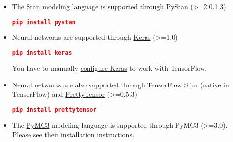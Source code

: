 \begin{itemize}
  \item The \href{http://mc-stan.org}{Stan} modeling language is supported
  through PyStan (>=2.0.1.3)
\begin{lstlisting}[language=JSON]
pip install pystan
\end{lstlisting}
  \item Neural networks are supported through
  \href{http://keras.io}{Keras} (>=1.0)
\begin{lstlisting}[language=JSON]
pip install keras
\end{lstlisting}
You have to manually \href{http://keras.io/#switching-from-theano-to-tensorflow}
{configure Keras} to work with TensorFlow.
\item Neural networks are also supported through
\href{https://github.com/tensorflow/tensorflow/tree/master/tensorflow/contrib/slim}{TensorFlow
Slim} (native in TensorFlow) and
\href{https://github.com/google/prettytensor}{PrettyTensor} (>=0.5.3)
\begin{lstlisting}[language=JSON]
pip install prettytensor
\end{lstlisting}
  \item The \href{http://pymc-devs.github.io/pymc3/}{PyMC3} modeling language is supported
  through PyMC3 (>=3.0). Please see their installation
  \href{http://pymc-devs.github.io/pymc3/notebooks/getting_started.html}
  {instructions}.
\end{itemize}
